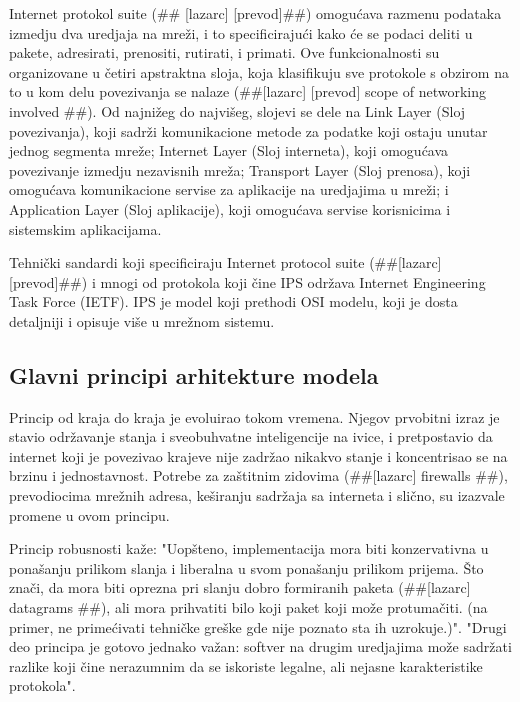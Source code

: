 \documentclass[a4paper,12pt, master]{etf}
\begin{document}
	Internet protokol suite (\#\# [lazarc] [prevod]\#\#) omogu\'{c}ava razmenu podataka izmedju dva
	uredjaja na mre\v{z}i, i to specificiraju\'{c}i kako \'{c}e se podaci deliti u pakete, adresirati,
	prenositi, rutirati, i primati. Ove funkcionalnosti su organizovane u \v{c}etiri apstraktna 
	sloja, koja klasifikuju sve protokole s obzirom na to u kom delu povezivanja se nalaze 
	(\#\#[lazarc] [prevod] scope of networking involved \#\#). Od najni\v{z}eg do najvi\v{s}eg, 
	slojevi se dele na Link	Layer (Sloj povezivanja), koji sadr\v{z}i komunikacione metode za 
	podatke koji ostaju unutar jednog segmenta mre\v{z}e; Internet Layer (Sloj interneta), koji 
	omogu\'{c}ava povezivanje izmedju nezavisnih mre\v{z}a; Transport Layer (Sloj prenosa), koji 
	omogu\'{c}ava komunikacione servise za aplikacije na uredjajima u mre\v{z}i; i Application Layer 
	(Sloj aplikacije), koji omogu\'{c}ava servise korisnicima i	sistemskim aplikacijama.

	Tehni\v{c}ki sandardi koji specificiraju Internet protocol suite (\#\#[lazarc] [prevod]\#\#) i 
	mnogi od protokola koji \v{c}ine IPS odr\v{z}ava Internet Engineering Task Force (IETF). IPS je 
	model koji prethodi OSI modelu, koji je dosta detaljniji i opisuje vi\v{s}e u mre\v{z}nom sistemu.

	\subsection{Glavni principi arhitekture modela}

	Princip od kraja do kraja je evoluirao tokom vremena. Njegov prvobitni izraz je stavio 
	odr\v{z}avanje stanja i sveobuhvatne inteligencije na ivice, i pretpostavio da internet koji je 
	povezivao krajeve nije zadr\v{z}ao nikakvo stanje i koncentrisao se na brzinu i jednostavnost. 
	Potrebe za za\v{s}titnim zidovima (\#\#[lazarc] firewalls \#\#), prevodiocima mre\v{z}nih adresa, 
	ke\v{s}iranju sadr\v{z}aja sa interneta i sli\v{c}no, su izazvale promene u ovom principu.

	Princip robusnosti ka\v{z}e: "Uop\v{s}teno, implementacija mora biti konzervativna u pona\v{s}anju 
	prilikom slanja i liberalna u svom pona\v{s}anju prilikom prijema. \v{S}to zna\v{c}i, da mora biti 
	oprezna pri slanju dobro formiranih paketa (\#\#[lazarc] datagrams \#\#), ali mora 
	prihvatiti bilo koji paket koji mo\v{z}e protuma\v{c}iti. (na primer, ne prime\'{c}ivati tehni\v{c}ke gre\v{s}ke 
	gde nije poznato sta ih uzrokuje.)". "Drugi deo principa je gotovo jednako va\v{z}an: softver na 
	drugim uredjajima mo\v{z}e sadr\v{z}ati razlike koji \v{c}ine nerazumnim da se iskoriste legalne, ali 
	nejasne karakteristike protokola".
\end{document}
